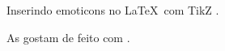 \documentclass[preview]{standalone}
\begin{document}
Inserindo emoticons \Cooley[2][yellow] no \LaTeX\ com TikZ \Winkey[2][yellow].

As \Person[2] gostam de \pot[2] feito com \eggbeater[4].
\end{document}
